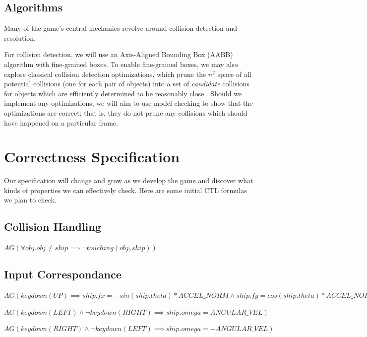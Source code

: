 \documentclass{article}
\begin{document}
    \subsection{Algorithms}

        Many of the game's central mechanics revolve around collision detection
        and resolution.

        For collision detection, we will use an Axis-Aligned Bounding Box (AABB)
        algorithm with fine-grained boxes. To enable fine-grained boxes, we may
        also explore classical collision detection optimizations, which prune
        the $n^2$ space of all potential collisions (one for each pair of
        objects) into a set of \textit{candidate} collisions for objects which
        are efficiently determined to be reasonably close
        \cite{moore1988collision, palmer1995collision}. Should we implement any
        optimizations, we will aim to use model checking to show that the
        optimizations are correct; that is, they do not prune any collisions
        which should have happened on a particular frame.

\section{Correctness Specification}
\label{sec:properties}

    Our specification will change and grow as we develop the game and discover
    what kinds of properties we can effectively check. Here are some initial CTL
    formulas we plan to check.

    \subsection{Collision Handling}

        $AG(\forall obj. obj \neq ship \implies \lnot touching(obj,ship))$

    \subsection{Input Correspondance}

        $AG(keydown(UP) \implies ship.fx = -sin(ship.theta) * ACCEL\_NORM
                        \land ship.fy = cos(ship.theta) * ACCEL\_NORM)$

        $AG(keydown(LEFT) \land \lnot keydown(RIGHT) \implies ship.omega = ANGULAR\_VEL)$

        $AG(keydown(RIGHT) \land \lnot keydown(LEFT) \implies ship.omega = -ANGULAR\_VEL)$
\end{document}
